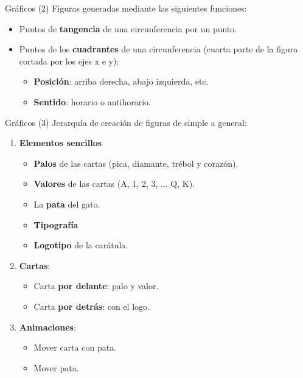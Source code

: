 \begin{frame}{Gráficos (2)}
    Figuras generadas mediante las siguientes funciones:
    \begin{itemize}
        \item Puntos de \textbf{tangencia} de una circunferencia por un punto.
        \item Puntos de los \textbf{cuadrantes} de una circunferencia (cuarta parte de la figura cortada por los ejes x e y): 
        \begin{itemize}
            \item \textbf{Posición}: arriba derecha, abajo izquierda, etc.
            \item \textbf{Sentido}: horario o antihorario.
        \end{itemize}
    \end{itemize}
\end{frame}

\begin{frame}{Gráficos (3)}
    Jerarquía de creación de figuras de simple a general:
    \begin{enumerate}
        \item \textbf{Elementos sencillos}
        \begin{itemize}
            \item \textbf{Palos} de las cartas (pica, diamante, trébol y corazón).
            \item \textbf{Valores} de las cartas (A, 1, 2, 3, ... Q, K).
            \item La \textbf{pata} del gato.
            \item \textbf{Tipografía}
            \item \textbf{Logotipo} de la carátula.
        \end{itemize}
        \item \textbf{Cartas}: 
        \begin{itemize}
            \item Carta \textbf{por delante}: palo y valor.
            \item Carta \textbf{por detrás}: con el logo. 
        \end{itemize}
        \item \textbf{Animaciones}: 
        \begin{itemize}
            \item Mover carta con pata.
            \item Mover pata.
        \end{itemize}
        
    \end{enumerate}
\end{frame}


